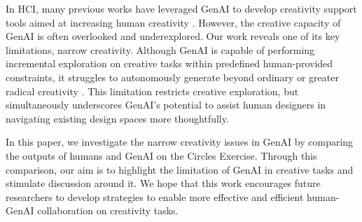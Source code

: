 In HCI, many previous works have leveraged GenAI to develop creativity support tools aimed at increasing human creativity \cite{choi2024creativeconnect, wang2024roomdreaming}. However, the creative capacity of GenAI is often overlooked and underexplored. Our work reveals one of its key limitations, narrow creativity. 
Although GenAI is capable of performing incremental exploration on creative tasks within predefined human-provided constraints, it struggles to autonomously generate beyond ordinary or greater radical creativity \cite{cropley2023intersection}. This limitation restricts creative exploration, but simultaneously underscores GenAI's potential to assist human designers in navigating existing design spaces more thoughtfully.

In this paper, we investigate the narrow creativity issues in GenAI by comparing the outputs of humans and GenAI on the Circles Exercise. Through this comparison, our aim is to highlight the limitation of GenAI in creative tasks and stimulate discussion around it. We hope that this work encourages future researchers to develop strategies to enable more effective and efficient human-GenAI collaboration on creativity tasks.
